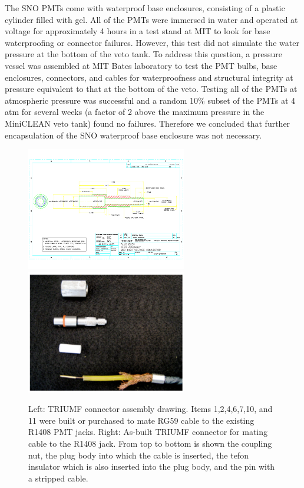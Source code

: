 \documentclass{JINST}
\begin{document}
The SNO PMTs come with waterproof base enclosures, consisting of a
plastic cylinder filled with gel.  All of the PMTs were immersed in water and operated at voltage for approximately 4 hours in a test stand at
MIT to look for base waterproofing or connector failures.  However,
this test did not simulate the water pressure at the bottom of the
veto tank.  To address this question, a pressure vessel was assembled
at MIT Bates laboratory to test the PMT bulbs, base enclosures, connectors, and
cables for waterproofness and structural integrity at pressure
equivalent to that at the bottom of the veto. Testing
all of the PMTs at atmospheric pressure was successful and a random
10\% subset of the PMTs at 4 atm for several weeks (a factor of 2
above the maximum pressure in the MiniCLEAN veto tank) found no
failures.  Therefore we concluded that further encapsulation of the
SNO waterproof base enclosure was not necessary.

\begin{figure}[ht]
\begin{center}
\includegraphics[width=2.75in,page=13]{graphics/snoConnectorDrawings.pdf}
\includegraphics[width=2.75in]{graphics/connectorpic.pdf}
\caption{Left: TRIUMF connector assembly drawing.  Items 1,2,4,6,7,10, and 11 were built or purchased to mate RG59 cable to the existing R1408 PMT jacks.  Right: As-built TRIUMF connector for mating cable to the R1408 jack.  From top to bottom is shown the coupling nut, the plug body into which the cable is inserted, the tefon insulator which is also inserted into the plug body, and the pin with a stripped cable.
\label{fig:connectordrawing}}
\end{center}
\end{figure}
\end{document}
